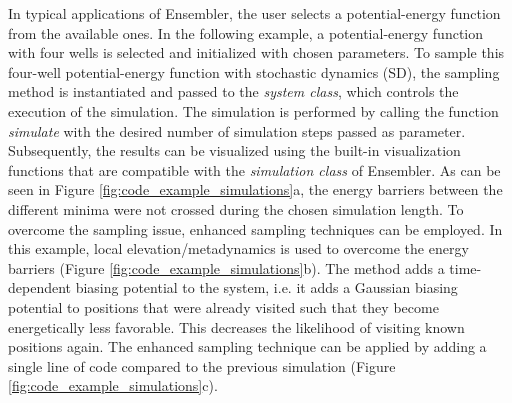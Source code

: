 In typical applications of Ensembler, the user selects a potential-energy function from the available ones. In the following example, a potential-energy function with four wells is selected and initialized with chosen parameters. 
To sample this four-well potential-energy function with stochastic dynamics (SD),\cite{Brunger1984} the sampling method is instantiated and passed to the \textit{system class}, which controls the execution of the simulation. 
The simulation is performed by calling the function \textit{simulate} with the desired number of simulation steps passed as parameter. 
Subsequently, the results can be visualized using the built-in visualization functions that are compatible with the \textit{simulation class} of Ensembler.  
As can be seen in Figure \ref{fig:code_example_simulations}a, the energy barriers between the different minima were not crossed during the chosen simulation length. 
To overcome the sampling issue, enhanced sampling techniques can be employed.\cite{Pohorille2010} 
In this example, local elevation\cite{Huber1994}/metadynamics\cite{Laio2002} is used to overcome the energy barriers (Figure \ref{fig:code_example_simulations}b).
The method adds a time-dependent biasing potential to the system, i.e. it adds a Gaussian biasing potential to positions that were already visited such that they become energetically less favorable. This decreases the likelihood of visiting known positions again. 
The enhanced sampling technique can be applied by adding a single line of code compared to the previous simulation (Figure \ref{fig:code_example_simulations}c).

